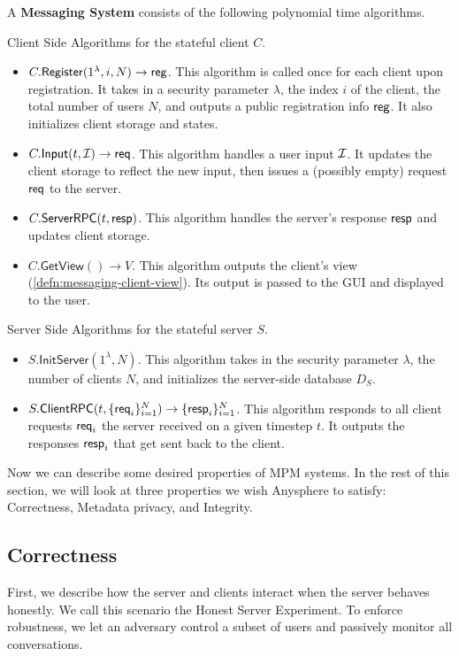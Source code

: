\begin{definition}
\label{defn:messaging-scheme}
A \textbf{Messaging System} consists of the following polynomial time algorithms.

Client Side Algorithms for the stateful client $C$.
\begin{itemize}
    \item $C.\mathsf{Register}(1^{\lambda}, i, N) \to \mathsf{reg}$. This algorithm is called once for each client upon registration. It takes in a security parameter $\lambda$, the index $i$ of the client, the total number of users $N$, and outputs a public registration info $\mathsf{reg}$. It also initializes client storage and states.
    
    \item $C.\mathsf{Input}(t, \mathcal{I}) \to \mathsf{req}$. This algorithm handles a user input $\mathcal{I}$. It updates the client storage to reflect the new input, then issues a (possibly empty) request $\mathsf{req}$ to the server.
    
    \item $C.\mathsf{ServerRPC}(t, \mathsf{resp})$. This algorithm handles the server's response $\mathsf{resp}$ and updates client storage.
    
    \item $C.\mathsf{GetView}() \to V$. This algorithm outputs the client's view (\cref{defn:messaging-client-view}). Its output is passed to the GUI and displayed to the user.
\end{itemize}

Server Side Algorithms for the stateful server $S$.

\begin{itemize}
    \item $S.\mathsf{InitServer}(1^{\lambda}, N)$. This algorithm takes in the security parameter $\lambda$, the number of clients $N$, and initializes the server-side database $D_S$.
    \item $S.\mathsf{ClientRPC}(t, \{\mathsf{req}_i\}_{i = 1}^N) \to \{\mathsf{resp}_i\}_{i = 1}^N$. This algorithm responds to all client requests $\mathsf{req}_i$ the server received on a given timestep $t$. It outputs the responses $\mathsf{resp}_i$ that get sent back to the client.
\end{itemize}
\end{definition}


Now we can describe some desired properties of MPM systems. In the rest of this section, we will look at three properties we wish Anysphere to satisfy: Correctness, Metadata privacy, and Integrity.

\subsection{Correctness}
\label{subsec:messaging-correctness}
First, we describe how the server and clients interact when the server behaves honestly. We call this scenario the Honest Server Experiment. To enforce robustness, we let an adversary control a subset of users and passively monitor all conversations.

